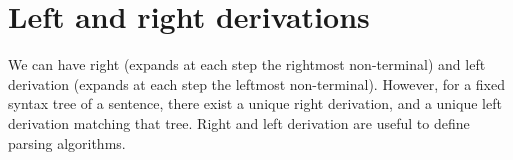 \section{Left and right derivations}

We can have right (expands at each step the rightmost non-terminal) and left derivation (expands at each step the leftmost non-terminal). 
However, for a fixed syntax tree of a sentence, there exist a unique right derivation, and a unique left derivation matching that tree. Right and left derivation are useful to define parsing algorithms. 